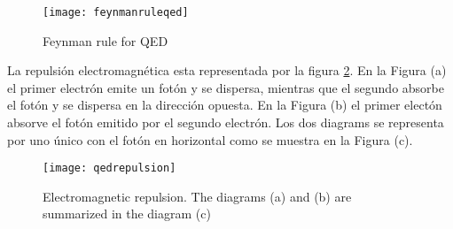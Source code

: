 \begin{figure}
  \texttt{[image: feynmanruleqed]} %
  \caption{Feynman rule for QED}
  \label{fig:feynmanruleqed}
\end{figure}

La repulsión electromagnética esta representada por la figura \ref{fig:qedrepulsion}. En la Figura (a) el primer electrón emite un fotón y se dispersa, mientras que el segundo absorbe el fotón y se dispersa en la dirección opuesta. En la Figura (b) el primer electón absorve el fotón emitido por el segundo electrón. Los dos diagrams se representa por uno único con el fotón en horizontal como se muestra en la Figura (c).

\begin{figure}
  \centering
  \texttt{[image: qedrepulsion]}
  \caption{Electromagnetic repulsion. The diagrams (a) and (b) are summarized in the diagram (c)}
  \label{fig:qedrepulsion}
\end{figure}


